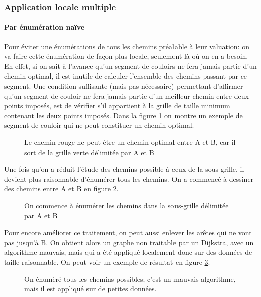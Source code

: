 \subsubsection{Application locale multiple}
\paragraph{Par énumération naïve}Pour éviter une énumérations de tous les chemins préalable à leur valuation: on va faire cette énumération de façon plus locale, seulement là où on en a besoin. En effet, si on sait à l'avance qu'un segment de couloirs ne fera jamais partie d'un chemin optimal, il est inutile de calculer l'ensemble des chemins passant par ce segment. Une condition suffisante (mais pas nécessaire) permettant d'affirmer qu'un segment de couloir ne fera jamais partie d'un meilleur chemin entre deux points imposés, est de vérifier s'il appartient à la grille de taille minimum contenant les deux points imposés. Dans la figure \ref{fig:grille2} on montre un exemple de segment de couloir qui ne peut constituer un chemin optimal.\\
\begin{figure}[h]
	\centering
	
	\caption{Le chemin rouge ne peut être un chemin optimal entre A et B, car il sort de la grille verte délimitée par A et B}
	\label{fig:grille2}
\end{figure}
Une fois qu'on a réduit l'étude des chemins possible à ceux de la sous-grille, il devient plus raisonnable d'énumérer tous les chemins. On a commencé à dessiner des chemins entre A et B en figure \ref{fig:grille3}.\\
\begin{figure}[h]
	\centering
	
	\caption{On commence à énumérer les chemins dans la sous-grille délimitée par A et B}
	\label{fig:grille3}
\end{figure}

Pour encore améliorer ce traitement, on peut aussi enlever les arêtes qui ne vont pas jusqu'à B. On obtient alors un graphe non traitable par un Dijkstra, avec un algorithme mauvais, mais qui a été appliqué localement donc sur des données de taille raisonnable. On peut voir un exemple de résultat en figure \ref{fig:grille4}.\\
\begin{figure}
	\centering
	
	\caption{On énumèré tous les chemins possibles; c'est un mauvais algorithme, mais il est appliqué sur de petites données.}
	\label{fig:grille4}
\end{figure}
